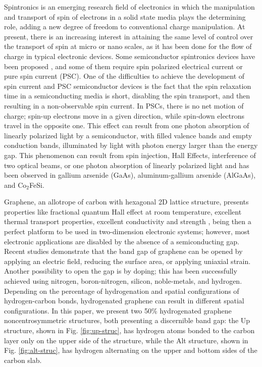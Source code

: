 \documentclass[floatfix,prb,aps,superscriptaddress,showpacs,11pt,preprint,letterpaper]{revtex4}
\begin{document}
Spintronics is an emerging research field of electronics in which the
manipulation and transport of spin of electrons in a solid state media plays the
determining role, adding a new degree of freedom to conventional charge
manipulation.\cite{wolfSC04,fabianAPS07} 
At present, there is an increasing interest in attaining the same level of
control over the transport of spin at micro or nano scales, as it has been done
for the flow of charge in typical electronic devices.\cite{awschalomNP2007} Some
semiconductor spintronics devices have been proposed \cite{majumdarAPL06,
dattaAPL90,gotteNat16,pershinPRB08}, and some of them require spin polarized
electrical current \cite{awschalomSSBM13} or pure spin current (PSC).
One of the difficulties to achieve the development of spin current and PSC
semiconductor devices is the fact that the spin relaxation time in a
semiconducting media is short, disabling the spin transport, and then resulting
in a non-observable spin current.\cite{murakamiSc03}
In PSCs, there is no net motion of charge; spin-up electrons move in a given
direction, while spin-down electrons travel in the opposite one. This effect can
result from one photon absorption of linearly polarized light by a
semiconductor, with filled valence bands and empty conduction bands, illuminated
by light with photon energy larger than the energy gap. This phenomenon can
result from spin injection,\cite{malPRB03} Hall Effects,\cite{sinovaPRB04}
interference of two optical beams,\cite{bhatPRL00, najmaiePRB03} or one photon
absorption of linearly polarized light\cite{bhatPRL05} and has been observed in
gallium arsenide (GaAs),\cite{zhaoPRL2006, stevensPRL03} aluminum-gallium
arsenide (AlGaAs),\cite{stevensPRL03} and Co$_2$FeSi.\cite{kimuraNGPAM12}

Graphene, an allotrope of carbon with hexagonal 2D lattice structure, presents
properties like fractional quantum Hall effect at room temperature, excellent
thermal transport properties, excellent conductivity\cite{heerscheNat07} and
strength \cite{geimNM07, reinaNL08, novoselov2S07, balandinNL08}, being then a
perfect platform to be used in two-dimension electronic systems; however, most
electronic applications are disabled by the absence of a semiconducting gap.
Recent studies demonstrate that the band gap of graphene can be opened by
applying an electric field,\cite{zhangN09} reducing the surface
area,\cite{hanPRL07} or applying uniaxial strain.\cite{niACSN08} Another
possibility to open the gap is by doping; this has been successfully achieved
using nitrogen,\cite{weiNL2009} boron-nitrogen,\cite{guoIJ11}
silicon,\cite{colettiPRB10} noble-metals,\cite{varykhalovPRB10} and
hydrogen.\cite{eliasS09, guisingerNL09, samarakoonACSN10}
Depending on the percentage of hydrogenation and spatial configurations of
hydrogen-carbon bonds, hydrogenated graphene can result in different spatial
configurations.
In this paper, we present two 50\% hydrogenated graphene noncentrosymmetric
structures, both presenting a discernible band gap: the Up structure, shown in
Fig. \ref{fig:up-struc}, has hydrogen atoms bonded to the carbon layer only on
the upper side of the structure, while the Alt structure, shown in Fig. 
\ref{fig:alt-struc}, has hydrogen alternating on the upper and bottom sides of 
the carbon slab.\cite{zapataPSB2016}
\end{document}
